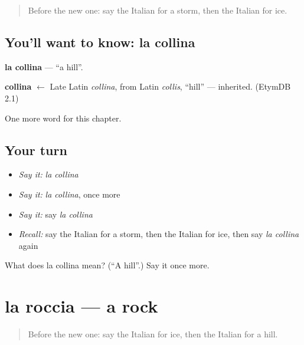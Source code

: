 \label{lesson:IT-C118-collina}



\begin{quote}
Before the new one: say the Italian for a storm, then the Italian for ice.
\end{quote}

\subsection*{You'll want to know: la collina}
\textbf{la collina} — \textquotedblleft{}a hill\textquotedblright{}.

\begin{cousinweb}
\textbf{collina} $\leftarrow$ Late Latin \emph{collina}, from Latin \emph{collis}, \textquotedblleft{}hill\textquotedblright{} — inherited. (EtymDB 2.1)
\end{cousinweb}

\begin{grammarlens}[title={What you've built}]
One more word for this chapter.
\end{grammarlens}

\subsection*{Your turn}
\begin{itemize}
\raggedright
  \item \emph{Say it:} \emph{la collina}
  \item \emph{Say it:} \emph{la collina}, once more
  \item \emph{Say it:} say \emph{la collina}
  \item \emph{Recall:} say the Italian for a storm, then the Italian for ice, then say \emph{la collina} again
\end{itemize}

\begin{tcolorbox}[breakable,colback=teal!4,colframe=teal!35!black,title={Before you move on}]
What does la collina mean? (\textquotedblleft{}A hill\textquotedblright{}.) Say it once more.
\end{tcolorbox}
\section[la roccia]{la roccia — a rock}

\label{lesson:IT-C118-roccia}



\begin{quote}
Before the new one: say the Italian for ice, then the Italian for a hill.
\end{quote}

